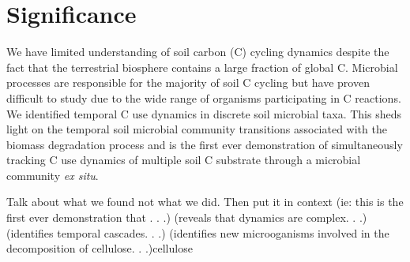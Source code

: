 \section{Significance} 
We have limited understanding of soil carbon (C) cycling dynamics despite the fact that the terrestrial biosphere contains a large fraction of global C. Microbial processes are responsible for the majority of soil C cycling but have proven difficult to study due to the wide range of organisms participating in C reactions. We identified temporal C use dynamics in discrete soil microbial taxa. This sheds light on the temporal soil microbial community transitions associated with the biomass degradation process and is the first ever demonstration of simultaneously tracking C use dynamics of multiple soil C substrate through a microbial community \textit{ex situ}.   

    

Talk about what we found not what we did. Then put it in context (ie: this is the first ever demonstration that . . .) (reveals that dynamics are complex. . .) (identifies temporal cascades. . .) (identifies new microoganisms involved in the decomposition of cellulose. . .)cellulose